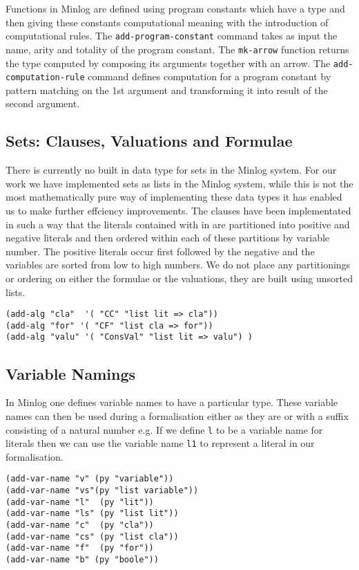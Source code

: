 Functions in Minlog are defined using program constants which have a type and then giving these constants computational meaning with the introduction of computational rules. The \texttt{add-program-constant} command takes as input the name, arity and totality of the program constant. The \texttt{mk-arrow} function returns the type computed by composing its arguments together with an arrow. The \texttt{add-computation-rule} command defines computation for a program constant by pattern matching on the 1st argument and transforming it into result of the second argument.


\subsection*{Sets: Clauses, Valuations and Formulae}
There is currently no built in data type for sets in the Minlog system. For our work we have implemented sets as lists in the Minlog system, while this is not the most mathematically pure way of implementing these data types it has enabled us to make further effciency improvements. The clauses have been implementated in such a way that the literals contained with in are partitioned into positive and negative literals and then ordered within each of these partitions by variable number. The positive literals occur first followed by the negative and the variables are sorted from low to high numbers. We do not place any partitionings or ordering on either the formulae or the valuations, they are built using unsorted lists.

\begin{lstlisting}[caption = "Definitions of clauses\, formulae and valulations in the Minlog system"]
(add-alg "cla"  '( "CC" "list lit => cla"))
(add-alg "for" '( "CF" "list cla => for"))
(add-alg "valu" '( "ConsVal" "list lit => valu") )
\end{lstlisting}

\subsection*{Variable Namings}
In Minlog one defines variable names to have a particular type.  These variable names can then be used during a formalisation either as they are or with a suffix consisting of a natural number e.g. If we define \texttt{l} to be a variable name for literals then we can use the variable name \texttt{l1} to represent a literal in our formalisation.

\begin{lstlisting}[caption = "Variable namings for the DPLL formalisation in Minlog"]
(add-var-name "v" (py "variable"))
(add-var-name "vs"(py "list variable"))
(add-var-name "l"  (py "lit"))
(add-var-name "ls" (py "list lit"))
(add-var-name "c"  (py "cla"))
(add-var-name "cs" (py "list cla"))
(add-var-name "f"  (py "for"))
(add-var-name "b" (py "boole"))
\end{lstlisting}

